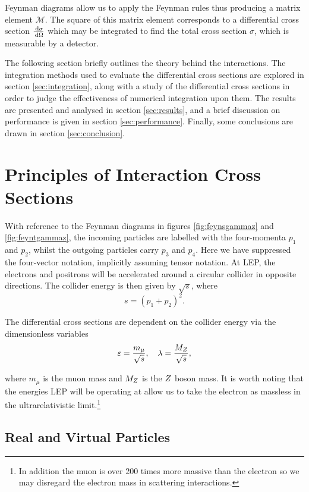 \documentclass[]{article}
\begin{document}
Feynman diagrams allow us to apply the Feynman rules thus producing a  matrix element $\mathcal{M}$. The square of this matrix element corresponds to a differential cross section $\frac{\,\operatorname{d}\!{\sigma}}{\,\operatorname{d}\!{\Omega}}$ which may be integrated to find the total cross section $\sigma$, which is measurable by a detector.

The following section briefly outlines the theory behind the interactions. The integration methods used to evaluate the differential cross sections are explored in section \ref{sec:integration}, along with a study of the differential cross sections in order to judge the effectiveness of numerical integration upon them. The results are presented and analysed in section \ref{sec:results}, and a brief discussion on performance is given in section \ref{sec:performance}. Finally, some conclusions are drawn in section \ref{sec:conclusion}.

\section{Principles of Interaction Cross Sections}

With reference to the Feynman diagrams in figures \ref{fig:feynsgammaz} and \ref{fig:feyntgammaz}, the incoming particles are labelled with the four-momenta $p_{1}$ and $p_{2}$, whilst the outgoing particles carry $p_{3}$ and $p_{4}$. Here we have suppressed the four-vector notation, implicitly assuming tensor notation. At LEP, the electrons and positrons will be accelerated around a circular collider in opposite directions. The collider energy is then given by $\sqrt{s}$, where $$s = (p_{1} + p_{2})^{2}.$$

The differential cross sections are dependent on the collider energy via the dimensionless variables $$\varepsilon = \frac{m_{\mu}}{\sqrt{s}}, \quad \lambda = \frac{M_{Z }}{\sqrt{s}},$$

where $m_{\mu}$ is the muon mass and $M_{Z }$ is the $Z $ boson mass. It is worth noting that the energies LEP will be operating at allow us to take the electron as massless in the ultrarelativistic limit.\footnote{In addition the muon is over 200 times more massive than the electron so we may disregard the electron mass in scattering interactions.}

\subsection{Real and Virtual Particles}
\end{document}
